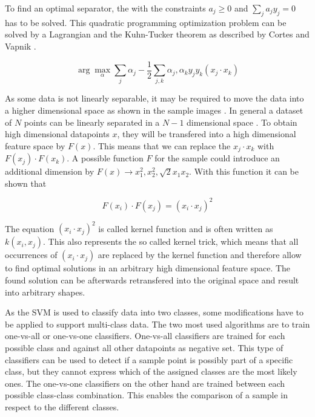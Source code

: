 To find an optimal separator, the  with the constraints $a_j \ge 0$ and $\sum_j a_j y_j = 0$ has to be solved. This quadratic programming optimization problem can be solved by a Lagrangian and the Kuhn-Tucker theorem as described by Cortes and Vapnik \cite{cortes1995support}.

\begin{equation}
\arg\max_\alpha \sum_j \alpha_j - \frac{1}{2} \sum_{j,k} \alpha_j, \alpha_k y_j y_k (x_j \cdot x_k)
\label{eqn:svm:maxmarg}
\end{equation}

As some data is not linearly separable, it may be required to move the data into a higher dimensional space as shown in the sample images . In general a dataset of $N$ points can be linearly separated in a $N-1$ dimensional space \cite{russellnorvig-ai}.
To obtain high dimensional datapoints $x$, they will be transfered into a high dimensional feature space by $F(x)$. This means that we can replace the $x_j \cdot x_k$ with $F(x_j) \cdot F(x_k)$. A possible function $F$ for the sample could introduce an additional dimension by $F(x) \rightarrow x_1^2, x_2^2, \sqrt{2} x_1 x_2$. With this function it can be shown that

\begin{equation}
F(x_i) \cdot F(x_j) = (x_i \cdot x_j)^2
\end{equation}

The equation $(x_i \cdot x_j)^2$ is called kernel function and is often written as $k(x_i, x_j)$. This also represents the so called kernel trick, which means that all occurrences of $(x_i \cdot x_j)$ are replaced by the kernel function and therefore allow to find optimal solutions in an arbitrary high dimensional feature space. The found solution can be afterwards retransfered into the original space and result into arbitrary shapes.

As the \ac{SVM} is used to classify data into two classes, some modifications have to be applied to support multi-class data. The two most used algorithms are to train one-vs-all or one-vs-one classifiers. One-vs-all classifiers are trained for each possible class and against all other datapoints as negative set. This type of classifiers can be used to detect if a sample point is possibly part of a specific class, but they cannot express which of the assigned classes are the most likely ones. The one-vs-one classifiers on the other hand are trained between each possible class-class combination. This enables the comparison of a sample in respect to the different classes.


